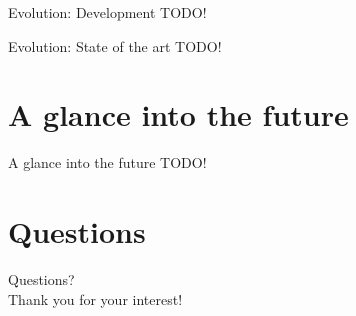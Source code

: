 \documentclass[12pt]{beamer}
\begin{document}
\begin{frame}[fragile]{Evolution: Development}
	TODO!
\end{frame}


\begin{frame}[fragile]{Evolution: State of the art}
	TODO!
\end{frame}

\section{A glance into the future}
\begin{frame}[fragile]{A glance into the future}
	TODO!
\end{frame}

\section{Questions}
\begin{frame}[standout]
	Questions? \\
	Thank you for your interest!
\end{frame}
\end{document}
